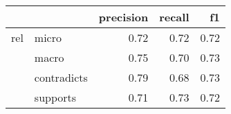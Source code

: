 \begin{tabular}{llrrr}
\toprule
    &          &  precision &  recall &   f1 \\
\midrule
rel & micro &       0.72 &    0.72 & 0.72 \\
    & macro &       0.75 &    0.70 & 0.73 \\
    & contradicts &       0.79 &    0.68 & 0.73 \\
    & supports &       0.71 &    0.73 & 0.72 \\
\bottomrule
\end{tabular}
